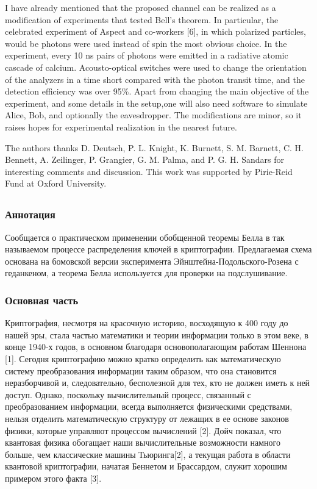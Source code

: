 I have already mentioned that the proposed channel can be realized as a modification of experiments that tested Bell's theorem. In particular, the celebrated experiment of Aspect and co-workers [6], in which polarized particles, would be photons were used instead of spin the most obvious choice. In the experiment, every 10 ns pairs of photons were emitted in a radiative atomic cascade of calcium. Acousto-optical switches were used to change the orientation of the analyzers in a time short compared with the photon transit time, and the detection efficiency was over 95\%. Apart from changing the main objective of the experiment, and some details in the setup,one will also need software to simulate Alice, Bob, and optionally the eavesdropper. The modifications are minor, so it raises hopes for experimental realization in the nearest future.

The authors thanks D. Deutsch, P. L. Knight, K. Burnett, S. M. Barnett, C. H. Bennett, A. Zeilinger, P. Grangier, G. M. Palma, and P. G. H. Sandars for interesting comments and discussion. This work was supported by Pirie-Reid Fund at Oxford University.

\subsection{\trnas}


\subsubsection*{Аннотация}

Сообщается о практическом применении обобщенной теоремы Белла в так называемом процессе распределения ключей в криптографии. Предлагаемая схема основана на бомовской версии эксперимента Эйнштейна-Подольского-Розена с геданкеном, а теорема Белла используется для проверки на подслушивание.

\subsubsection{Основная часть}

Криптография, несмотря на красочную историю, восходящую к 400 году до нашей эры, стала частью математики и теории информации только в этом веке, в конце 1940-х годов, в основном благодаря основополагающим работам Шеннона [1]. Сегодня криптографию можно кратко определить как математическую систему преобразования информации таким образом, что она становится неразборчивой и, следовательно, бесполезной для тех, кто не должен иметь к ней доступ. Однако, поскольку вычислительный процесс, связанный с преобразованием информации, всегда выполняется физическими средствами, нельзя отделить математическую структуру от лежащих в ее основе законов физики, которые управляют процессом вычислений [2]. Дойч показал, что квантовая физика обогащает наши вычислительные возможности намного больше, чем классические машины Тьюринга[2], а текущая работа в области квантовой криптографии, начатая Беннетом и Брассардом, служит хорошим примером этого факта [3].

